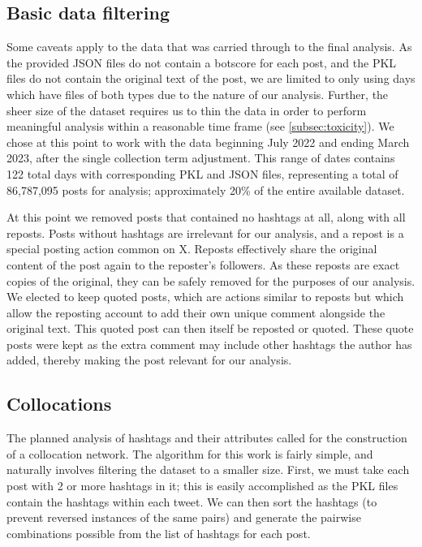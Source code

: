 \documentclass[a4paper,11pt]{article}  %
\begin{document}
	\subsection{Basic data filtering}
	\label{subsec:filters}
	Some caveats apply to the data that was carried through to the final analysis. As the provided JSON files do not contain a botscore for each post, and the PKL files do not contain the original text of the post, we are limited to only using days which have files of both types due to the nature of our analysis. Further, the sheer size of the dataset requires us to thin the data in order to perform meaningful analysis within a reasonable time frame (see \autoref{subsec:toxicity}). We chose at this point to work with the data beginning July 2022 and ending March 2023, after the single collection term adjustment. This range of dates contains 122 total days with corresponding PKL and JSON files, representing a total of 86,787,095 posts for analysis; approximately 20\% of the entire available dataset. 
	
	At this point we removed posts that contained no hashtags at all, along with all reposts. Posts without hashtags are irrelevant for our analysis, and a repost is a special posting action common on X. Reposts effectively share the original content of the post again to the reposter's followers. As these reposts are exact copies of the original, they can be safely removed for the purposes of our analysis. We elected to keep quoted posts, which are actions similar to reposts but which allow the reposting account to add their own unique comment alongside the original text. This quoted post can then itself be reposted or quoted. These quote posts were kept as the extra comment may include other hashtags the author has added, thereby making the post relevant for our analysis.

	\subsection{Collocations}
	\label{subsec:collocation}
	The planned analysis of hashtags and their attributes called for the construction of a collocation network. The algorithm for this work is fairly simple, and naturally involves filtering the dataset to a smaller size. First, we must take each post with 2 or more hashtags in it; this is easily accomplished as the PKL files contain the hashtags within each tweet. We can then sort the hashtags (to prevent reversed instances of the same pairs) and generate the pairwise combinations possible from the list of hashtags for each post.
	
\end{document}
